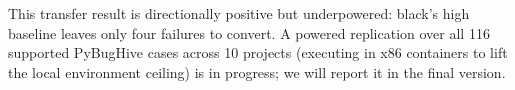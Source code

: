 This transfer result is directionally positive but underpowered: black's high
baseline leaves only four failures to convert.
A powered replication over all 116 supported PyBugHive cases across 10
projects (executing in x86 containers to lift the local environment ceiling)
is in progress; we will report it in the final version.

